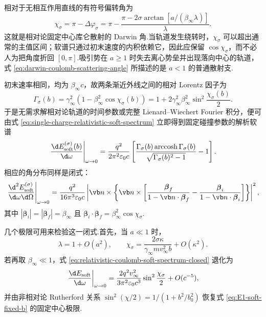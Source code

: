 相对于无相互作用直线的有符号偏转角为
\begin{equation}
 \chi_\sigma
 =\pi-\Delta\varphi_\sigma
 =\pi-\frac{\pi-2\sigma\arctan[a/(\beta_\infty\lambda)]}{\lambda}.
 \label{eq:darwin-coulomb-scattering-angle}
\end{equation}
这就是相对论固定中心库仑散射的 Darwin 角.当轨道发生绕转时，$\chi_\sigma$ 可以超出通常的主值区间；软谱只通过初末速度的内积依赖它，因此应保留 $\cos\chi_\sigma$，而不必人为把角度折回 $[0,\pi]$.吸引势在 $a\geq1$ 时失去离心势垒并出现落向中心的轨道，式 \eqref{eq:darwin-coulomb-scattering-angle} 所描述的是 $a<1$ 的普通散射支.

初末速率相同，均为 $\beta_\infty c$，故两条渐近外线之间的相对 Lorentz 因子为
\begin{equation}
 \Gamma_\sigma(b)
 =\gamma_\infty^2
 \left(1-\beta_\infty^2\cos\chi_\sigma(b)\right)
 =1+2\gamma_\infty^2\beta_\infty^2
 \sin^2\frac{\chi_\sigma(b)}{2}.
 \label{eq:relativistic-coulomb-relative-gamma}
\end{equation}
于是无需求解相对论轨道的时间参数或完整 Lienard--Wiechert Fourier 积分，便可由式 \eqref{eq:single-charge-relativistic-soft-spectrum} 立即得到固定碰撞参数的解析软谱
\begin{equation}
 \left.\frac{\d E_{\mathrm{soft}}^{(\sigma)}(b)}{\d\omega}\right|_{\omega\to0}
 =\frac{q^2}{2\pi^2\varepsilon_0c}
 \left[
 \frac{\Gamma_\sigma(b)\operatorname{arccosh}\Gamma_\sigma(b)}
 {\sqrt{\Gamma_\sigma(b)^2-1}}-1
 \right].
 \label{eq:relativistic-coulomb-soft-spectrum-closed}
\end{equation}
相应的角分布同样是闭式：
\begin{equation}
 \left.\frac{\d^2E_{\mathrm{soft}}^{(\sigma)}}{\d\omega\d\Omega}\right|_{\omega\to0}
 =\frac{q^2}{16\pi^3\varepsilon_0c}
 \left|
 \vb n\times\left\{\vb n\times
 \left[
 \frac{\boldsymbol\beta_f}{1-\vb n\cdot\boldsymbol\beta_f}
 -\frac{\boldsymbol\beta_i}{1-\vb n\cdot\boldsymbol\beta_i}
 \right]\right\}
 \right|^2,
 \label{eq:relativistic-coulomb-soft-angular-closed}
\end{equation}
其中 $|\boldsymbol\beta_i|=|\boldsymbol\beta_f|=\beta_\infty$ 且 $\boldsymbol\beta_i\cdot\boldsymbol\beta_f=\beta_\infty^2\cos\chi_\sigma$.

几个极限可用来检验这一闭式.首先，当 $a\ll1$ 时，
\begin{equation}
 \lambda=1+O(a^2),
 \qquad
 \chi_\sigma
 =\frac{2\sigma\kappa}{\gamma_\infty m v_\infty^2b}+O(\kappa^2).
 \label{eq:relativistic-coulomb-weak-angle}
\end{equation}
若再取 $\beta_\infty\ll1$，式 \eqref{eq:relativistic-coulomb-soft-spectrum-closed} 退化为
\begin{equation}
 \left.\frac{\d E_{\mathrm{soft}}}{\d\omega}\right|_{\omega\to0}
 =\frac{2q^2v_\infty^2}{3\pi^2\varepsilon_0c^3}
 \sin^2\frac{\chi_\sigma}{2}
 +O(c^{-5}),
 \label{eq:relativistic-coulomb-soft-nonrel-check}
\end{equation}
并由非相对论 Rutherford 关系 $\sin^2(\chi/2)=1/(1+b^2/b_0^2)$ 恢复式 \eqref{eq:E1-soft-fixed-b} 的固定中心极限.

